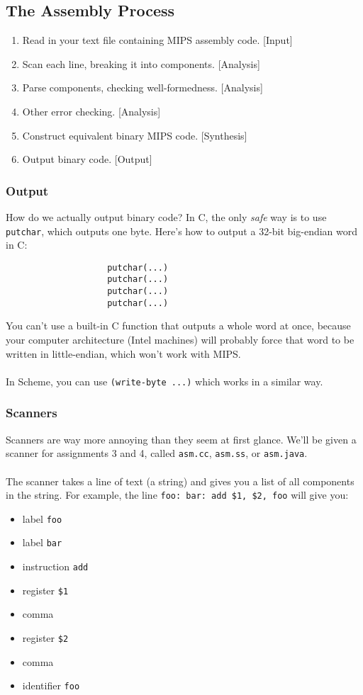 \documentclass[]{article}
\theoremstyle{definition}
\begin{document}
		\subsection{The Assembly Process}
			\begin{enumerate}
				\item Read in your text file containing MIPS assembly code. [Input]
				\item Scan each line, breaking it into components. [Analysis]
				\item Parse components, checking well-formedness. [Analysis]
				\item Other error checking. [Analysis]
				\item Construct equivalent binary MIPS code. [Synthesis]
				\item Output binary code. [Output]
			\end{enumerate}

			\subsubsection{Output}
				How do we actually output binary code? In C, the only \emph{safe} way is to use \verb+putchar+, which outputs one byte. Here's how to output a 32-bit big-endian word in C:
				\begin{verbatim}
					putchar(...)
					putchar(...)
					putchar(...)
					putchar(...)
				\end{verbatim}

				You can't use a built-in C function that outputs a whole word at once, because your computer architecture (Intel machines) will probably force that word to be written in little-endian, which won't work with MIPS.
				\\ \\
				In Scheme, you can use \verb+(write-byte ...)+ which works in a similar way.
			
			\subsubsection{Scanners}
				Scanners are way more annoying than they seem at first glance. We'll be given a scanner for assignments 3 and 4, called \verb+asm.cc+, \verb+asm.ss+, or \verb+asm.java+.
				\\ \\
				The scanner takes a line of text (a string) and gives you a list of all components in the string. For example, the line \verb+foo: bar: add $1, $2, foo+ will give you:
				\begin{itemize}
					\item label \verb+foo+
					\item label \verb+bar+
					\item instruction \verb+add+
					\item register \verb+$1+
					\item comma
					\item register \verb+$2+
					\item comma
					\item identifier \verb+foo+
				\end{itemize}
\end{document}
